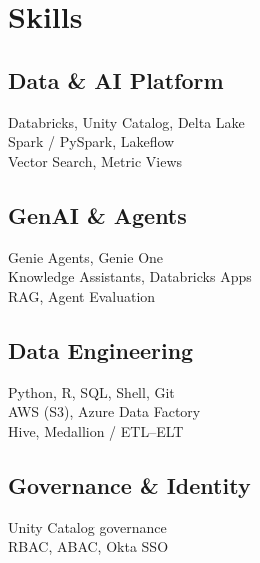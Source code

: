\documentclass[letterpaper]{deedy-resume}
\begin{document}



\begin{minipage}[t]{0.33\textwidth}

\section{Skills}
\vspace{1mm}

\subsection{Data \& AI Platform}
Databricks, Unity Catalog, Delta Lake \\
Spark / PySpark, Lakeflow \\
Vector Search, Metric Views

\sectionspace

\subsection{GenAI \& Agents}
Genie Agents, Genie One \\
Knowledge Assistants, Databricks Apps \\
RAG, Agent Evaluation

\sectionspace

\subsection{Data Engineering}
Python, R, SQL, Shell, Git \\
AWS (S3), Azure Data Factory \\
Hive, Medallion / ETL--ELT

\sectionspace

\subsection{Governance \& Identity}
Unity Catalog governance \\
RBAC, ABAC, Okta SSO


\end{minipage}
\end{document}
